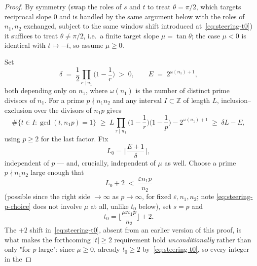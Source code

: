 \documentclass[a4paper,11pt,oneside,reqno]{amsart}
\theoremstyle{definition}
\theoremstyle{remark}
\theoremstyle{plain}
\newcommand{\Z}{\mathbb{Z}}
\begin{document}
\begin{proof}
  By symmetry (swap the roles of \(s\) and \(t\) to treat \(\theta=\pi/2\), which targets reciprocal
  slope \(0\) and is handled by the same argument below with the roles of \(n_1,n_2\) exchanged,
  subject to the same window shift introduced at~\eqref{eq:steering-t0}) it suffices to treat
  \(\theta\ne\pi/2\), i.e.\ a finite target slope \(\mu=\tan\theta\); the case \(\mu<0\) is identical
  with \(t\mapsto-t\), so assume \(\mu\ge0\).

  Set
  \begin{equation}
    \label{eq:steering-constants}
    \delta \;=\; \frac12\prod_{r\mid n_1}\Big(1-\frac1r\Big) \;>\; 0, \qquad E \;=\;
    2^{\omega(n_1)+1},
  \end{equation}
  both depending only on \(n_1\), where \(\omega(n_1)\) is the number of distinct prime divisors of
  \(n_1\). For a prime \(p\nmid n_1n_2\) and any interval \(I\subset\Z\) of length \(L\),
  inclusion--exclusion over the divisors of \(n_1p\) gives
  \begin{equation}
    \label{eq:steering-sieve}
    \#\{t\in I : \gcd(t,n_1p)=1\} \;\ge\; L\prod_{r\mid n_1}\Big(1-\frac1r\Big)\Big(1-\frac1p\Big) -
    2^{\omega(n_1)+1} \;\ge\; \delta L - E,
  \end{equation}
  using \(p\ge2\) for the last factor. Fix
  \begin{equation}
    \label{eq:steering-L0}
    L_0 = \Big\lceil \frac{E+1}{\delta} \Big\rceil,
  \end{equation}
  independent of \(p\) --- and, crucially, independent of \(\mu\) as well. Choose a prime \(p\nmid n_1n_2\)
  large enough that
  \begin{equation}
    \label{eq:steering-p-choice}
    L_0 + 2 \;<\; \frac{\varepsilon n_1p}{n_2}
  \end{equation}
  (possible since the right side \(\to\infty\) as \(p\to\infty\), for fixed \(\varepsilon,n_1,n_2\); note
  \eqref{eq:steering-p-choice} does not involve \(\mu\) at all, unlike \(t_0\) below), set \(s=p\) and
  \begin{equation}
    \label{eq:steering-t0}
    t_0 = \Big\lfloor \frac{\mu n_1p}{n_2} \Big\rfloor + 2.
  \end{equation}
  The \(+2\) shift in~\eqref{eq:steering-t0}, absent from an earlier version of this proof, is what
  makes the forthcoming \(|t|\ge2\) requirement hold \emph{unconditionally} rather than only "for \(p\)
  large": since \(\mu\ge0\), already \(t_0\ge2\) by~\eqref{eq:steering-t0}, so every integer in the

\end{proof}
\end{document}
